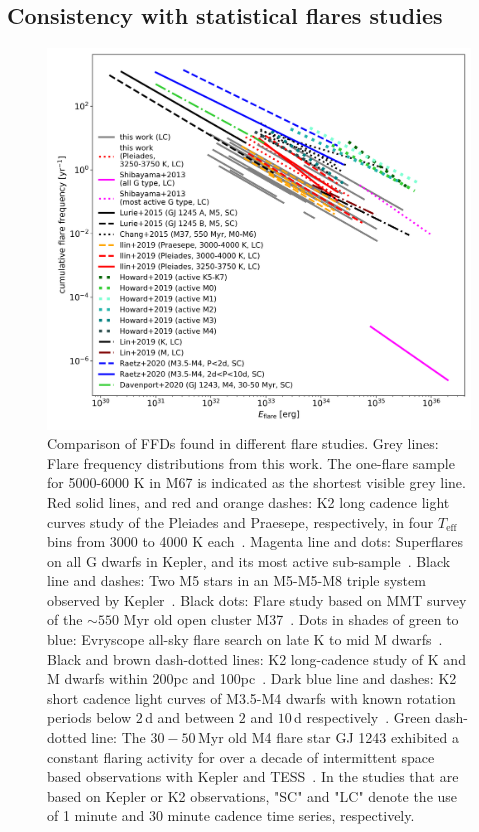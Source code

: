 \documentclass{aa}
\begin{document}
\subsection{Consistency with statistical flares studies}
\label{sec:consistency_other_work}
\begin{figure}[ht!]
    \centering
    \includegraphics[width=13.5cm]{pics/FFDs/discussion_FFDs.png}
    \caption{Comparison of FFDs found in different flare studies. Grey lines: Flare frequency distributions from this work. The one-flare sample for 5000-6000 K in M67 is indicated as the shortest visible grey line. Red solid lines, and red and orange dashes: K2 long cadence light curves study of the Pleiades and Praesepe, respectively, in four $T_\mathrm{eff}$ bins from 3000 to 4000 K each~. Magenta line and dots: Superflares on all G dwarfs in Kepler, and its most active sub-sample~\citep{shibayama2013}. Black line and dashes: Two M5 stars in an M5-M5-M8 triple system observed by Kepler~\citep{lurie2015}. Black dots: Flare study based on MMT survey of the $\sim550$ Myr old open cluster M37~\citep{chang2015}. Dots in shades of green to blue: Evryscope all-sky flare search on late K to mid M dwarfs~\citep{howard2019}. Black and brown dash-dotted lines: K2 long-cadence study of K and M dwarfs within 200pc and 100pc~\citep{lin2019}. Dark blue line and dashes: K2 short cadence light curves of M3.5-M4 dwarfs with known rotation periods below $2\,$d and between $2$ and $10\,$d respectively~\citep{raetz2020}. Green dash-dotted line: The $30-50$\,Myr old M4 flare star GJ 1243 exhibited a constant flaring activity for over a decade of intermittent space based observations with Kepler and TESS~\citep{davenport2020arxiv}. In the studies that are based on Kepler or K2 observations, "SC" and "LC" denote the use of 1 minute and 30 minute cadence time series, respectively.}      
    \label{fig:otherwork}
\end{figure}
\end{document}
